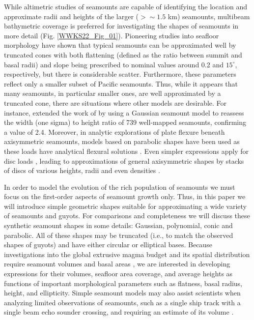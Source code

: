 While altimetric studies of seamounts are capable of identifying the location and approximate radii
and heights of the larger ($> \sim 1.5$ km) seamounts, multibeam bathymetric coverage is preferred for investigating
the shapes of seamounts in more detail (Fig. \ref{WWKS22_Fig_01}).  Pioneering studies into seafloor morphology
\citep{JMS1983,SJ1988,S1988} have shown that typical seamounts can be approximated well by truncated cones
with both flattening (defined as the ratio between summit and basal radii) and slope being prescribed
to nominal values around 0.2 and $15^\circ$, respectively, but there is considerable scatter. Furthermore,
these parameters reflect only a smaller subset of Pacific seamounts.
Thus, while it appears that many seamounts, in particular smaller ones, are well approximated by a truncated cone,
there are situations where other models are desirable.  For instance, \citet{G2022} extended the work of
\citet{S1988} by using a Gaussian seamount model to reassess the width (one sigma) to height ratio of 739
well-mapped seamounts, confirming a value of 2.4.  Moreover, in analytic explorations of plate flexure
beneath axisymmetric seamounts, models based on parabolic shapes have been used as these loads have analytical
flexural solutions \citep[e.g.,~][]{LN1980,W2001,KW2010}.  Even simpler expressions apply for disc loads
\citep{BS1969}, leading to approximations of general axisymmetric shapes by stacks of discs of various heights,
radii and even densities \citep[e.g.,~][]{HC1994}.

In order to model the evolution of the rich population of seamounts we must focus on the first-order
aspects of seamount growth only.  Thus, in this paper we will introduce simple geometric shapes suitable
for approximating a wide variety of seamounts and guyots.
For comparisons and completeness we will discuss these synthetic
seamount shapes in some details: Gaussian, polynomial, conic and parabolic.  All of these shapes may be truncated
(i.e., to match the observed shapes of guyots) and have either circular or elliptical bases.  Because investigations
into the global extrusive magma budget and its spatial distribution require seamount volumes and basal areas \citep[e.g.,~][]{B1982},
we are interested in developing expressions for their volumes, seafloor area coverage, and average heights
as functions of important morphological parameters such as flatness, basal radius, height, and ellipticity.
Simple seamount models may also assist scientists when analyzing limited observations of seamounts, such as a single
ship track with a single beam echo sounder crossing, and requiring an estimate of its volume \citep[e.g.,~][]{HW2007}. 

